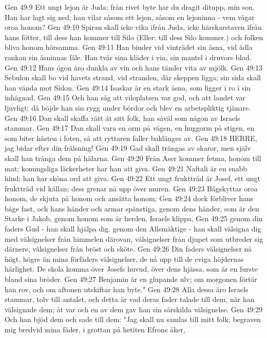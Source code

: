 Gen 49:9  Ett ungt lejon är Juda; från rivet byte har du dragit ditupp, min son. Han har lagt sig ned, han vilar såsom ett lejon, såsom en lejoninna - vem vågar oroa honom?
Gen 49:10  Spiran skall icke vika ifrån Juda, icke härskarstaven ifrån hans fötter, till dess han kommer till Silo (Eller: till dess Silo kommer.) och folken bliva honom hörsamma.
Gen 49:11  Han binder vid vinträdet sin åsna, vid ädla rankan sin åsninnas fåle. Han tvår sina kläder i vin, sin mantel i druvors blod.
Gen 49:12  Hans ögon äro dunkla av vin och hans tänder vita av mjölk.
Gen 49:13  Sebulon skall bo vid havets strand, vid stranden, där skeppen ligga; sin sida skall han vända mot Sidon.
Gen 49:14  Isaskar är en stark åsna, som ligger i ro i sin inhägnad.
Gen 49:15  Och han såg att viloplatsen var god, och att landet var ljuvligt; då böjde han sin rygg under bördor och blev en arbetspliktig tjänare.
Gen 49:16  Dan skall skaffa rätt åt sitt folk, han såväl som någon av Israels stammar.
Gen 49:17  Dan skall vara en orm på vägen, en huggorm på stigen, en som biter hästen i foten, så att ryttaren faller baklänges av.
Gen 49:18  HERRE, jag bidar efter din frälsning!
Gen 49:19  Gad skall trängas av skaror, men själv skall han tränga dem på hälarna.
Gen 49:20  Från Aser kommer fetma, honom till mat; konungsliga läckerheter har han att giva.
Gen 49:21  Naftali är en snabb hind; han har sköna ord att giva.
Gen 49:22  Ett ungt fruktträd är Josef, ett ungt fruktträd vid källan; dess grenar nå upp över muren.
Gen 49:23  Bågskyttar oroa honom, de skjuta på honom och ansätta honom;
Gen 49:24  dock förbliver hans båge fast, och hans händer och armar spänstiga, genom dens händer, som är den Starke i Jakob, genom honom som är herden, Israels klippa,
Gen 49:25  genom din faders Gud - han skall hjälpa dig. genom den Allsmäktige - han skall välsigna dig med välsignelser från himmelen därovan, välsignelser från djupet som utbreder sig därnere, välsignelser från bröst och sköte.
Gen 49:26  Din faders välsignelser nå högt, högre än mina förfäders välsignelser, de nå upp till de eviga höjdernas härlighet. De skola komma över Josefs huvud, över dens hjässa, som är en furste bland sina bröder.
Gen 49:27  Benjamin är en glupande ulv; om morgonen förtär han rov, och om aftonen utskiftar han byte."
Gen 49:28  Alla dessa äro Israels stammar, tolv till antalet, och detta är vad deras fader talade till dem, när han välsignade dem; åt var och en av dem gav han sin särskilda välsignelse.
Gen 49:29  Och han bjöd dem och sade till dem: "Jag skall nu samlas till mitt folk; begraven mig bredvid mina fäder, i grottan på hetiten Efrons åker,
